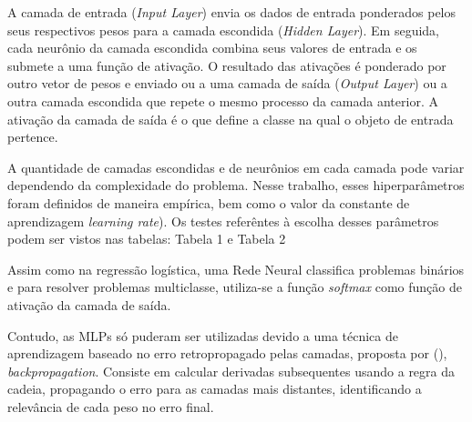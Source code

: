 \documentclass[conference]{IEEEtran}
\begin{document}
  A camada de entrada (\textit{Input Layer}) envia os dados de entrada ponderados pelos seus respectivos pesos para a camada escondida (\textit{Hidden Layer}). Em seguida, cada neurônio da camada escondida combina seus valores de entrada e os submete a uma função de ativação. O resultado das ativações é ponderado por outro vetor de pesos e enviado ou a uma camada de saída (\textit{Output Layer}) ou a outra camada escondida que repete o mesmo processo da camada anterior. A ativação da camada de saída é o que define a classe na qual o objeto de entrada pertence. 
  
  A quantidade de camadas escondidas e de neurônios em cada camada pode variar dependendo da complexidade do problema. Nesse trabalho, esses hiperparâmetros foram definidos de maneira empírica, bem como o valor da constante de aprendizagem \textit{learning rate}). Os testes referêntes à escolha desses parâmetros podem ser vistos nas tabelas: Tabela 1 e Tabela 2
  
  Assim como na regressão logística, uma Rede Neural classifica problemas binários e para resolver problemas multiclasse, utiliza-se a função \textit{softmax} como função de ativação da camada de saída.
  
  Contudo, as MLPs só puderam ser utilizadas devido a uma técnica de aprendizagem baseado no erro retropropagado pelas camadas, proposta por \citeauthor{rumelhart1986learning} (\citeyear{rumelhart1986learning}), \textit{backpropagation}. Consiste em calcular derivadas subsequentes usando a regra da cadeia, propagando o erro para as camadas mais distantes, identificando a relevância de cada peso no erro final.
  
  
	 


\end{document}

